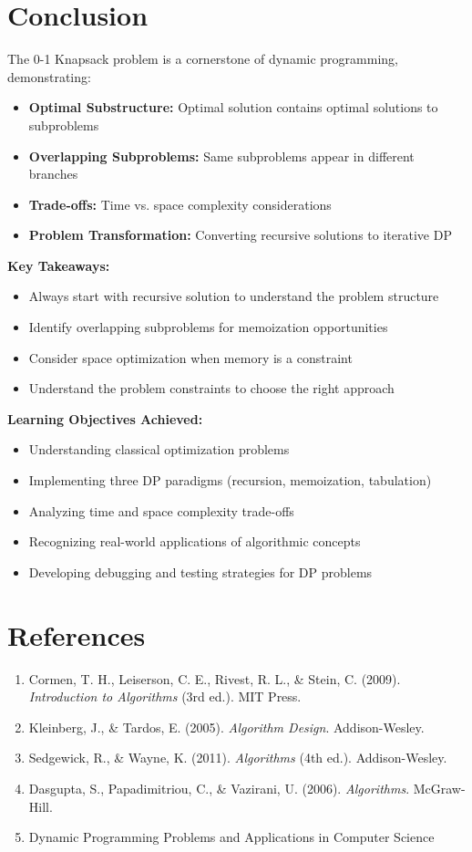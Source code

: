 \documentclass[12pt,a4paper]{article}
\begin{document}
\section{Conclusion}

The 0-1 Knapsack problem is a cornerstone of dynamic programming, demonstrating:

\begin{itemize}
\item \textbf{Optimal Substructure:} Optimal solution contains optimal solutions to subproblems
\item \textbf{Overlapping Subproblems:} Same subproblems appear in different branches
\item \textbf{Trade-offs:} Time vs. space complexity considerations
\item \textbf{Problem Transformation:} Converting recursive solutions to iterative DP
\end{itemize}

\textbf{Key Takeaways:}
\begin{itemize}
\item Always start with recursive solution to understand the problem structure
\item Identify overlapping subproblems for memoization opportunities
\item Consider space optimization when memory is a constraint
\item Understand the problem constraints to choose the right approach
\end{itemize}

\textbf{Learning Objectives Achieved:}
\begin{itemize}
\item Understanding classical optimization problems
\item Implementing three DP paradigms (recursion, memoization, tabulation)
\item Analyzing time and space complexity trade-offs
\item Recognizing real-world applications of algorithmic concepts
\item Developing debugging and testing strategies for DP problems
\end{itemize}

\section{References}

\begin{enumerate}
\item Cormen, T. H., Leiserson, C. E., Rivest, R. L., \& Stein, C. (2009). \textit{Introduction to Algorithms} (3rd ed.). MIT Press.
\item Kleinberg, J., \& Tardos, E. (2005). \textit{Algorithm Design}. Addison-Wesley.
\item Sedgewick, R., \& Wayne, K. (2011). \textit{Algorithms} (4th ed.). Addison-Wesley.
\item Dasgupta, S., Papadimitriou, C., \& Vazirani, U. (2006). \textit{Algorithms}. McGraw-Hill.
\item Dynamic Programming Problems and Applications in Computer Science
\end{enumerate}
\end{document}
